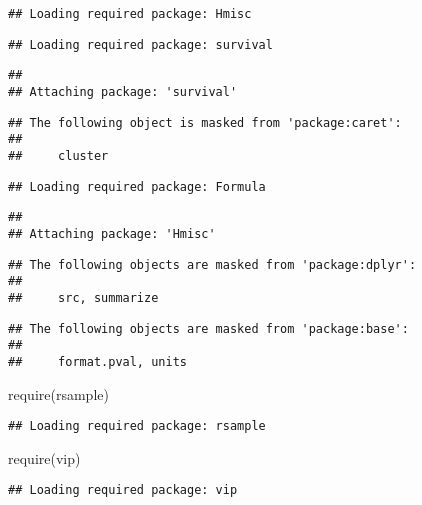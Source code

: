 \documentclass[
]{article}
\newenvironment{Shaded}{\begin{snugshade}}{\end{snugshade}}
\newcommand{\FunctionTok}[1]{\textcolor[rgb]{0.00,0.00,0.00}{#1}}
\newcommand{\NormalTok}[1]{#1}
\begin{document}
\begin{verbatim}
## Loading required package: Hmisc
\end{verbatim}

\begin{verbatim}
## Loading required package: survival
\end{verbatim}

\begin{verbatim}
## 
## Attaching package: 'survival'
\end{verbatim}

\begin{verbatim}
## The following object is masked from 'package:caret':
## 
##     cluster
\end{verbatim}

\begin{verbatim}
## Loading required package: Formula
\end{verbatim}

\begin{verbatim}
## 
## Attaching package: 'Hmisc'
\end{verbatim}

\begin{verbatim}
## The following objects are masked from 'package:dplyr':
## 
##     src, summarize
\end{verbatim}

\begin{verbatim}
## The following objects are masked from 'package:base':
## 
##     format.pval, units
\end{verbatim}

\begin{Shaded}
\begin{Highlighting}[]
  \FunctionTok{require}\NormalTok{(rsample)}
\end{Highlighting}
\end{Shaded}

\begin{verbatim}
## Loading required package: rsample
\end{verbatim}

\begin{Shaded}
\begin{Highlighting}[]
  \FunctionTok{require}\NormalTok{(vip)}
\end{Highlighting}
\end{Shaded}

\begin{verbatim}
## Loading required package: vip
\end{verbatim}
\end{document}
